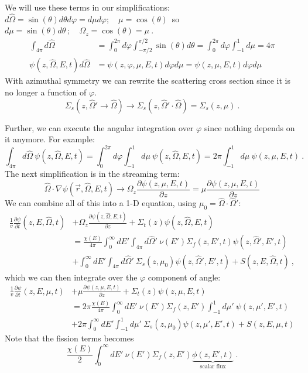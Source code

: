 \documentclass[12pt]{article}
\newcommand{\omvec}{\ensuremath{\hat{\Omega}}}
\newcommand{\vOmega}{\ensuremath{\hat{\Omega}}}
\begin{document}
We will use these terms in our simplifications:\\
$d\vOmega = \sin(\theta) d\theta d\varphi = d\mu d\varphi; \quad \mu = \cos(\theta)\,$ so $d\mu = \sin(\theta)d\theta\:; \quad \Omega_z = \cos(\theta) = \mu\:.$
\begin{align*}
\int_{4 \pi} d\vOmega &= \int_0^{2\pi} d\varphi \int_{-\pi/2}^{\pi/2} \sin(\theta) d\theta =  \int_0^{2\pi} d\varphi \int_{-1}^1 d\mu = 4\pi \\
\psi(z,\vOmega,E,t) d\vOmega &= \psi(z,\varphi, \mu,E,t) d\varphi  d\mu =  \psi(z, \mu,E,t) d\varphi  d\mu 
\end{align*}
%
With azimuthal symmetry we can rewrite the scattering cross section since it is no longer a function of $\varphi$.
\[\Sigma_s(z, \vOmega' \rightarrow \vOmega) \rightarrow \Sigma_s(z, \vOmega' \cdot \vOmega) = \Sigma_s(z, \mu) \:.\]

Further, we can execute the angular integration over $\varphi$ since nothing depends on it anymore. For example:
\[
\int_{4 \pi} d\vOmega\: \psi(z, \vOmega, E, t) =   \int_0^{2\pi} d\varphi \int_{-1}^1 d\mu \:\psi(z, \vOmega, E, t) = 2 \pi \int_{-1}^1 d\mu \:\psi(z, \mu, E, t)\:.\]
%
The next simplification is in the streaming term:
\[\vOmega \cdot \nabla \psi(\vec{r}, \vOmega, E, t) \rightarrow \Omega_z \frac{\partial \psi(z, \mu, E, t)}{\partial z} = \mu \frac{\partial \psi(z, \mu, E, t)}{\partial z} \]
%
We can combine all of this into a 1-D equation, using $\mu_0 = \vOmega \cdot \vOmega'$:
\begin{align*}
\frac{1}{v}\frac{\partial \psi}{\partial t}(z,E,\omvec,t) &+ \Omega_z \frac{\partial \psi(z, \vOmega, E, t)}{\partial z} + \Sigma_t(z)\psi(z, \vOmega, E, t)  \\
&= \frac{\chi(E)}{4 \pi} \int_0^{\infty} dE'\int_{4 \pi} d\vOmega'\:  \nu(E')\Sigma_f(z,E',t)\psi(z, \vOmega', E', t)  \\
&+ \int_0^{\infty} dE' \int_{4 \pi} d\vOmega'\: \Sigma_s(z, \mu_0)\psi(z, \vOmega', E', t) + S(z, E, \vOmega, t)\:,
\end{align*}
%
which we can then integrate over the $\varphi$ component of angle:
\begin{align*}
\frac{1}{v}\frac{\partial \psi}{\partial t}(z,E,\mu,t) &+ \mu \frac{\partial \psi(z, \mu, E, t)}{\partial z} + \Sigma_t(z)\psi(z, \mu, E, t) \\
&= 2\pi\frac{\chi(E)}{4 \pi} \int_0^{\infty} dE' \: \nu(E')\Sigma_f(z,E') \int_{-1}^1 d\mu'\: \psi(z, \mu', E', t) \\
&+ 2\pi\int_0^{\infty} dE' \int_{-1}^1 d\mu'\: \Sigma_s(z, \mu_0)\psi(z, \mu', E', t)  + S(z, E, \mu, t)
\end{align*}
%
Note that the fission terms becomes
\[\frac{\chi(E)}{2} \int_0^{\infty} dE'\:  \nu(E')\Sigma_f(z,E')\underbrace{\phi(z, E', t)}_{\text{scalar flux}}\:. \]
\end{document}
